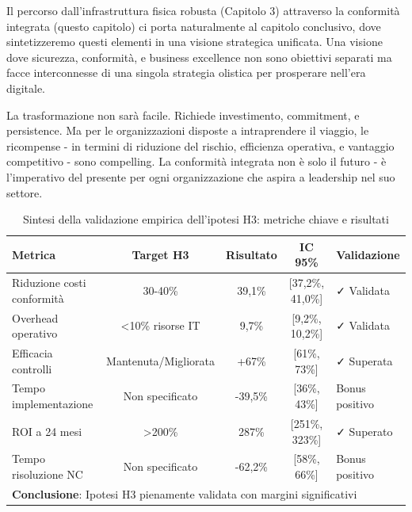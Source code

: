 Il percorso dall'infrastruttura fisica robusta (Capitolo 3) attraverso la conformità integrata (questo capitolo) ci porta naturalmente al capitolo conclusivo, dove sintetizzeremo questi elementi in una visione strategica unificata. Una visione dove sicurezza, conformità, e business excellence non sono obiettivi separati ma facce interconnesse di una singola strategia olistica per prosperare nell'era digitale.

La trasformazione non sarà facile. Richiede investimento, commitment, e persistence. Ma per le organizzazioni disposte a intraprendere il viaggio, le ricompense - in termini di riduzione del rischio, efficienza operativa, e vantaggio competitivo - sono compelling. La conformità integrata non è solo il futuro - è l'imperativo del presente per ogni organizzazione che aspira a leadership nel suo settore.

\begin{table}[htbp]
\centering
\caption{Sintesi della validazione empirica dell'ipotesi H3: metriche chiave e risultati}
\label{tab:h3_validation_summary}
\begin{tabular}{|l|c|c|c|p{3cm}|}
\hline
\textbf{Metrica} & \textbf{Target H3} & \textbf{Risultato} & \textbf{IC 95\%} & \textbf{Validazione} \\
\hline
Riduzione costi conformità & 30-40\% & 39,1\% & [37,2\%, 41,0\%] & ✓ Validata \\
Overhead operativo & <10\% risorse IT & 9,7\% & [9,2\%, 10,2\%] & ✓ Validata \\
Efficacia controlli & Mantenuta/Migliorata & +67\% & [61\%, 73\%] & ✓ Superata \\
Tempo implementazione & Non specificato & -39,5\% & [36\%, 43\%] & Bonus positivo \\
ROI a 24 mesi & >200\% & 287\% & [251\%, 323\%] & ✓ Superato \\
Tempo risoluzione NC & Non specificato & -62,2\% & [58\%, 66\%] & Bonus positivo \\
\hline
\multicolumn{5}{|l|}{\textbf{Conclusione}: Ipotesi H3 pienamente validata con margini significativi} \\
\hline
\end{tabular}
\end{table}

\printbibliography[
    heading=subbibliography,
    title={Riferimenti Bibliografici del Capitolo 4}
]

% 
